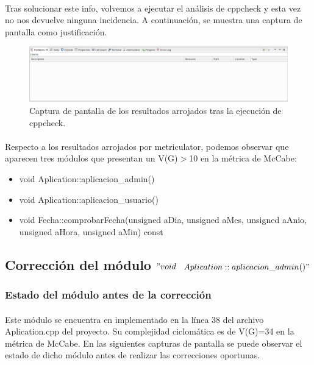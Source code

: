  		\paragraph{}Tras solucionar este info, volvemos a ejecutar el análisis de cppcheck y esta vez no nos devuelve ninguna incidencia. A continuación, se muestra una captura de pantalla como justificación.
 		
 		\begin{figure}[H]
 			\centering
 			\includegraphics[scale=0.32]{img/captura96.png}
 			\caption{Captura de pantalla de los resultados arrojados tras la ejecución de cppcheck.}
 			\label{captura96}
 		\end{figure}
 	
 		\paragraph{}Respecto a los resultados arrojados por metriculator, podemos observar que aparecen tres módulos que presentan un V(G)$>$10 en la métrica de McCabe:
 		
 		\begin{itemize}
 			\item void Aplication::aplicacion\_admin()
 			\item void Aplication::aplicacion\_usuario()
 			\item void Fecha::comprobarFecha(unsigned aDia, unsigned aMes, unsigned aAnio, unsigned aHora, unsigned aMin) const
 		\end{itemize}
 		
 		
 	\subsection{Corrección del módulo $"void$ $Aplication::aplicacion\_admin()"$}
 	
 		\subsubsection{Estado del módulo antes de la corrección}
 		
 		\paragraph{}Este módulo se encuentra en implementado en la línea 38 del archivo Aplication.cpp del proyecto. Su complejidad ciclomática es de V(G)=34 en la métrica de McCabe. En las siguientes capturas de pantalla se puede observar el estado de dicho módulo antes de realizar las correcciones oportunas.
 		

